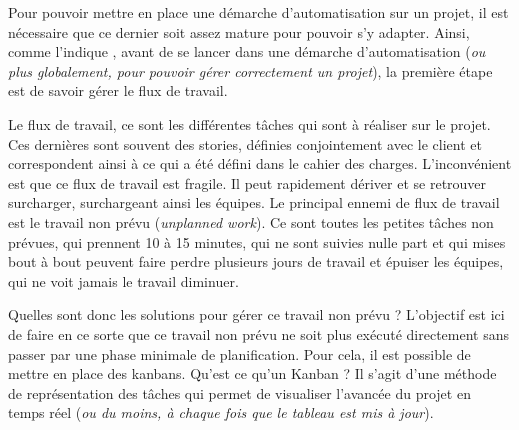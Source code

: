 Pour pouvoir mettre en place une démarche d'automatisation sur un projet, il est nécessaire que ce dernier soit assez mature pour pouvoir s'y adapter. Ainsi, comme l'indique  \cite{phoenixProject},  avant de se lancer dans une démarche d'automatisation (\emph{ou plus globalement, pour pouvoir gérer correctement un projet}), la première étape est de savoir gérer le flux de travail.

Le flux de travail, ce sont les différentes tâches qui sont à réaliser sur le projet. Ces dernières sont souvent des stories, définies conjointement avec le client et correspondent ainsi à ce qui a été défini dans le cahier des charges. L'inconvénient est que ce flux de travail est fragile. Il peut rapidement dériver et se retrouver surcharger, surchargeant ainsi les équipes. Le principal ennemi de flux de travail est le travail non prévu (\emph{unplanned work}). Ce sont toutes les petites tâches non prévues, qui prennent 10 à 15 minutes, qui ne sont suivies nulle part et qui mises bout à bout peuvent faire perdre plusieurs jours de travail et épuiser les équipes, qui ne voit jamais le travail diminuer.

Quelles sont donc les solutions pour gérer ce travail non prévu ? L'objectif est ici de faire en ce sorte que ce travail non prévu ne soit plus exécuté directement sans passer par une phase minimale de planification. Pour cela, il est possible de mettre en place des kanbans. Qu'est ce qu'un Kanban ? Il s'agit d'une méthode de représentation des tâches qui permet de visualiser l'avancée du projet en temps réel (\emph{ou du moins, à chaque fois que le tableau est mis à jour}). 


